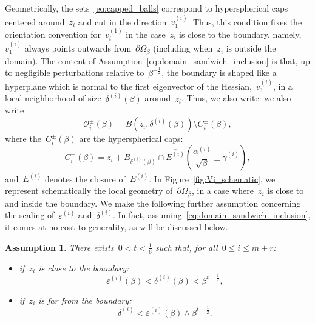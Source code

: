 \documentclass[10pt]{article}
\newcommand{\1}{\mathbbm 1}
\newcommand{\epsBoundary}[1]{\varepsilon^{(#1)}} %
\newcommand{\deltaRadius}[1]{\delta^{(#1)}} %
\newcommand{\epsLimit}[1]{\alpha^{(#1)}} %
\newcommand{\localNeighborhood}[2][]{\mathcal{O}_{#2}^{#1}} %
\newcommand{\localCap}[2][]{C_{#2}^{#1}}
\newcommand{\gammaPerturbation}[1]{\gamma^{(#1)}}
\newcommand{\hessEigvec}[2]{v^{(#1)}_{#2}} %
\newcommand{\halfSpace}[1]{E^{(#1)}}
\newcommand{\scalingExp}{t}
\newtheorem{hypothesis}{Assumption}
\begin{document}
    Geometrically, the sets~\eqref{eq:capped_balls} correspond to hyperspherical caps centered around~$z_i$ and cut in the direction~$\hessEigvec{i}{1}$. Thus, this condition fixes the orientation convention for~$\hessEigvec{1}{i}$ in the case~$z_i$ is close to the boundary, namely,~$\hessEigvec{i}{1}$ always points outwards from~$\partial\Omega_\beta$ (including when~$z_i$ is outside the domain).
    The content of Assumption~\eqref{eq:domain_sandwich_inclusion} is that, up to negligible perturbations relative to~$\beta^{-\frac12}$, the boundary is shaped like a hyperplane which is normal to the first eigenvector of the Hessian,~$\hessEigvec{i}{1}$, in a local neighborhood of size~$\deltaRadius{i}(\beta)$ around~$z_i$.
    Thus, we also write:
    we also write
    \begin{equation}
        \localNeighborhood[\pm]{i}(\beta) = B(z_i,\deltaRadius{i}(\beta)) \setminus \localCap[\pm]{i}(\beta),
    \end{equation}
    where the~$\localCap[\pm]{i}(\beta)$ are the hyperspherical caps:
    \begin{equation}
        \label{eq:def_ball_cap}
        \localCap[\pm]{i}(\beta) = z_i + B_{\deltaRadius{i}(\beta)}\cap \overline{\halfSpace{i}}\left(\frac{\epsLimit{i}}{\sqrt\beta}\pm\gammaPerturbation{i}\right),
    \end{equation}
    and~$\overline{\halfSpace{i}}$ denotes the closure of~$\halfSpace{i}$.
    In Figure~\ref{fig:Vi_schematic}, we represent schematically the local geometry of~$\partial\Omega_\beta$, in a case where~$z_i$ is close to and inside the boundary.
    We make the following further assumption concerning the scaling of~$\epsBoundary{i}$ and~$\deltaRadius{i}$. In fact, assuming~\eqref{eq:domain_sandwich_inclusion}, it comes at no cost to generality, as will be discussed below.
    \begin{hypothesis}
        There exists~$0<\scalingExp<\frac16$ such that, for all~$0\leq i\leq m+r$:
        
        \begin{itemize}
            \item{if~$z_i$ is close to the boundary:
        \begin{equation}
            \tag{\bf H2}
            \label{eq:deltai_polybound_close}
            \epsBoundary{i}(\beta)<\deltaRadius{i}(\beta) < \beta^{\scalingExp-\frac12},
        \end{equation}}
        
        \item{if~$z_i$ is far from the boundary:
                \begin{equation}
            \tag{\bf H2'}
            \label{eq:deltai_polybound_far}
            \deltaRadius{i}<\epsBoundary{i}(\beta)\land\beta^{\scalingExp-\frac12}.
        \end{equation}}
        \end{itemize}
    \end{hypothesis}
\end{document}
